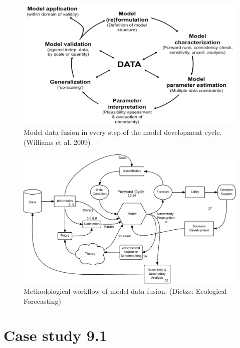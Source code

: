 \documentclass[12pt,oneside]{book}
\begin{document}
\begin{figure}

{\centering \includegraphics[width=0.8\linewidth]{figures/chap9/f96_willimas} 

}

\caption{Model data fusion in every step of the model development cycle. (Williams et al. 2009)}\label{fig:f96}
\end{figure}

\begin{figure}

{\centering \includegraphics[width=0.8\linewidth]{figures/chap9/f97_dietze} 

}

\caption{Methodological workflow of model data fusion. (Dietze: Ecological Forecasting)}\label{fig:f97}
\end{figure}

\section{Case study 9.1}\label{case-study-9.1}
\end{document}

